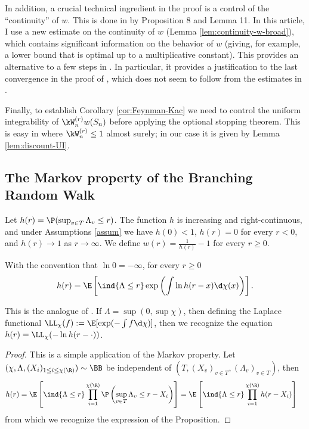 \documentclass[10pt,a4paper]{article}
\begin{document}
In addition, a crucial technical ingredient in the proof is a control of the ``continuity'' of $w$. This is done in \cite{lalley2015maximal} by Proposition 8 and Lemma 11. In this article, I use a new estimate on the continuity of $w$ (Lemma \ref{lem:continuity-w-broad}), which contains significant information on the behavior of $w$ (giving, for example, a lower bound that is optimal up to a multiplicative constant). This provides an alternative to a few steps in \cite{lalley2015maximal}. In particular, it provides a justification to the last convergence in the proof of \cite[Lemma 11]{lalley2015maximal}, which does not seem to follow from the estimates in \cite{lalley2015maximal}. 

Finally, to establish Corollary \ref{cor:Feynman-Kac} we need to control the uniform integrability of $\kW^{(r)}_n w(S_n)$ before applying the optional stopping theorem. This is easy in \cite{lalley2015maximal} where $\kW^{(r)}_n \leq 1$ almost surely; in our case it is given by Lemma \ref{lem:discount-UI}.




\subsection{The Markov property of the Branching Random Walk}
\label{sec:Markov-ppty-BRW}


Let $h(r) = \P(\sup_{v\in T} \Lambda_v \leq r)$. The function $h$ is increasing and right-continuous, and under Assumptions \ref{assum} we have $h(0)<1$, $h(r)=0$ for every $r<0$, and $h(r)\to 1$ as $r\to\infty$. We define $w(r) = \frac{1}{h(r)}-1$ for every $r\geq 0$. 

\begin{proposition}\label{prop:convolution-equation}
With the convention that $\ln 0 = -\infty$, for every $r\geq 0$
\begin{equation}
h(r) = \E\left[ \ind{\Lambda\leq r} \exp\left( \int \ln h(r-x) \d \chi(x) \right) \right] .
\end{equation}
\end{proposition}

This is the analogue of \cite[Proposition 5]{lalley2015maximal}. If $\Lambda = \sup(0, \sup\chi)$, then defining the Laplace functional $\LL_\chi(f) := \E[\exp(-\int f \d\chi)]$, then we recognize the equation $h(r) = \LL_\chi(-\ln h(r-\cdot))$.

\begin{proof}
This is a simple application of the Markov property. Let $(\chi, \Lambda, (X_i)_{1\leq i \leq \chi(\R)}) \sim \BB$ be independent of $(T, (X_v)_{v\in T}, (\Lambda_v)_{v\in T})$, then
\begin{align*}
h(r) &= \E\left[ \ind{\Lambda\leq r} \prod_{i=1}^{\chi(\R)} \P\left( \sup_{v\in T} \Lambda_v \leq r-X_i \right) \right] = \E\left[ \ind{\Lambda\leq r} \prod_{i=1}^{\chi(\R)} h(r-X_i) \right]
\end{align*}
from which we recognize the expression of the Proposition. 
\end{proof}
\end{document}
